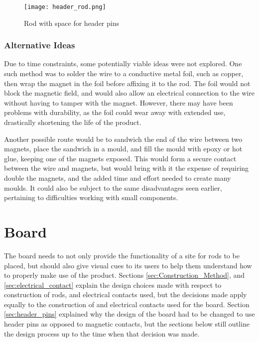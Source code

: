 \begin{figure}[H]
	\begin{center}
	\texttt{[image: header\_rod.png]}\\ 
  	\caption{Rod with space for header pins}
    \label{fig:header_rod}
    \end{center}
\end{figure}

\subsubsection{Alternative Ideas}
Due to time constraints, some potentially viable ideas were not explored. One such method was to solder the wire to a conductive metal foil, such as copper, then wrap the magnet in the foil before affixing it to the rod. The foil would not block the magnetic field, and would also allow an electrical connection to the wire without having to tamper with the magnet. However, there may have been problems with durability, as the foil could wear away with extended use, drastically shortening the life of the product. 

Another possible route would be to sandwich the end of the wire between two magnets, place the sandwich in a mould, and fill the mould with epoxy or hot glue, keeping one of the magnets exposed. This would form a secure contact between the wire and magnets, but would bring with it the expense of requiring double the magnets, and the added time and effort needed to create many moulds. It could also be subject to the same disadvantages seen earlier, pertaining to difficulties working with small components.


    
    
\section{Board}
\label{sec:board}

The board needs to not only provide the functionality of a site for rods to be placed, but should also give visual cues to its users to help them understand how to properly make use of the product. Sections \ref{sec:Construction_Method}, and \ref{sec:electrical_contact} explain the design choices made with respect to construction of rods, and electrical contacts used, but the decisions made apply equally to the construction of and electrical contacts used for the board. Section \ref{sec:header_pins} explained why the design of the board had to be changed to use header pins as opposed to magnetic contacts, but the sections below still outline the design process up to the time when that decision was made. 



